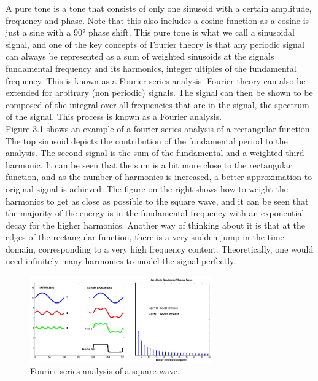  A pure tone is a tone that consists of only one sinusoid with a certain amplitude, frequency and phase. Note that this also includes a cosine function as a cosine is just a sine with a 90° phase shift. This pure tone is what we call a sinusoidal signal, and one of the key concepts of Fourier theory is that any periodic signal can always be represented as a sum of weighted sinusoids at the signals fundamental frequency and its harmonics, integer ultiples of the fundamental frequency. This is known as a Fourier series analysis.  Fourier theory can also be extended for arbitrary (non periodic) signals. The signal can then be shown to be composed of the integral over all frequencies that are in the signal, the spectrum of the signal.  This process is known as a Fourier analysis. \\

Figure 3.1 shows an example of a fourier series analysis of a rectangular function. The top sinusoid depicts the contribution of the fundamental period to the analysis. The second signal is the sum of the fundamental and a weighted third harmonic. It can be seen that the sum is a bit more close to the rectangular function, and as the number of harmonics is increased, a better approximation to original signal is achieved. The figure on the right shows how to weight the harmonics to get as close as possible to the square wave, and it can be seen that the majority of the energy is in the fundamental frequency with an exponential decay for the higher harmonics.  Another way of thinking about it is that at the edges of the rectangular function, there is a very sudden jump in the time domain, corresponding to a very high frequency content. Theoretically, one would need infinitely many harmonics to model the signal perfectly.\\

\begin{figure}
    \includegraphics[width=0.7\textwidth]{Pictures/Chapter3_Lesson_1/FourierSquare.png}
    \caption{Fourier series analysis of a square wave.}
\end{figure}

